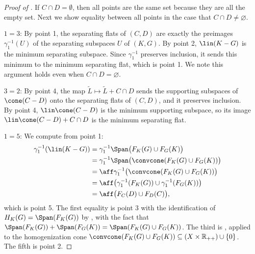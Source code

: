 \documentclass{article}
\theoremstyle{plain}
\theoremstyle{definition}
\theoremstyle{remark}
\begin{document}
\begin{proof}[\hypertarget{loc:affine_cross:lineality.proof}{}Proof of ]

If $C \cap D =  \emptyset$, then all points are the same set because they are
all the empty set. Next we show equality between all points in the case that $C \cap D \neq \varnothing$.

$1 = 3$:
By  point 1,
the separating flats of $(C,D)$ are exactly the preimages $\gamma_1^{-1}(U)$ of the separating subspaces $U$ of $(K,G)$. By  point 2, $\lin(K-G)$ is the minimum separating subspace. Since $\gamma_1^{-1}$ preserves inclusion, it sends this minimum to the minimum separating flat, which is point 1. We note this argument holds even when $C \cap D = \varnothing$.

$3 = 2$:
By  point 4, the map $\tilde{L} \mapsto \tilde{L} + C \cap D$ sends the supporting subspaces of $\cone(C-D)$ onto the separating flats of $(C,D)$, and it preserves inclusion. By  point 4, $\lin\cone(C-D)$ is the minimum supporting subspace, so its image $\lin\cone(C-D) + C \cap D$ is the minimum separating flat.

$1 = 5$:
We compute from point 1:
\begin{align*}
\gamma_1^{-1}(\lin(K-G))
&= \gamma_1^{-1}\Span\bigl(F_K(G) \cup F_G(K)\bigr)\\
&= \gamma_1^{-1}\Span\bigl(\convcone(F_K(G) \cup F_G(K))\bigr)\\
&= \aff \gamma_1^{-1}\bigl(\convcone(F_K(G) \cup F_G(K))\bigr)\\
&= \aff\bigl(\gamma_1^{-1}(F_K(G)) \cup \gamma_1^{-1}(F_G(K))\bigr)\\
&= \aff\bigl(F_C(D) \cup F_D(C)\bigr),
\end{align*}
which is point 5. The first equality is  point 3 with the identification of $H_K(G) = \Span(F_K(G))$ by , with the fact that 
$\Span(F_K(G)) + \Span(F_G(K)) =  \Span(F_K(G) \cup F_G(K))$. The third is , applied to the homogenization cone $\convcone(F_K(G) \cup F_G(K)) \subseteq (X \times \mathbb{R}_{++}) \cup \{0\}$.
The fifth is  point 2.


\end{proof}
\end{document}
